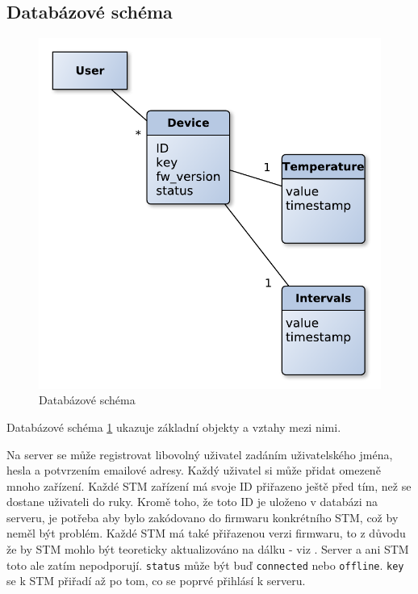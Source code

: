\subsection{Databázové schéma}

\begin{figure}[tbh]\centering
\includegraphics[scale=0.6]{../diagrams/databazove_schema.pdf}
\caption{Databázové schéma}
\label{databazoveschema}
\end{figure}

Databázové schéma \ref{databazoveschema} ukazuje základní objekty a vztahy mezi nimi.

Na server se může registrovat libovolný uživatel zadáním uživatelského jména, hesla a potvrzením
emailové adresy.
Každý uživatel si může přidat omezeně mnoho zařízení.
Každé STM zařízení má svoje ID přiřazeno ještě před tím, než se dostane uživateli do ruky.
Kromě toho, že toto ID je uloženo v databázi na serveru, je potřeba aby bylo zakódovano do firmwaru
konkrétního STM, což by neměl být problém.
Každé STM má také přiřazenou verzi firmwaru, to z důvodu že by STM mohlo být teoreticky aktualizováno
na dálku - viz \cite{FW-update-over-ethernet}.
Server a ani STM toto ale zatím nepodporují.
\texttt{status} může být buď \texttt{connected} nebo \texttt{offline}.
\texttt{key} se k STM přiřadí až po tom, co se poprvé přihlásí k serveru.

